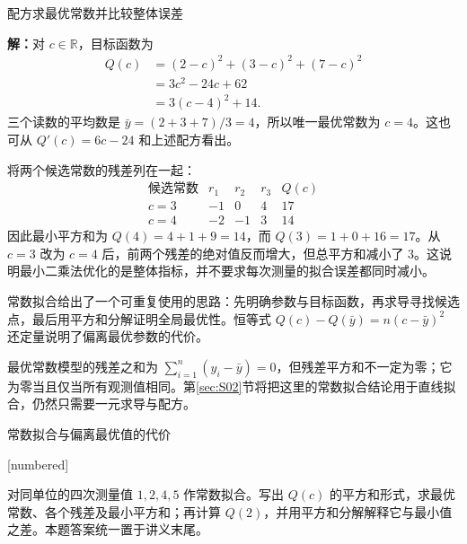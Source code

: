 \documentclass[aspectratio=169,10pt,fontset=fandol]{ctexbeamer}
\makeatletter
\newcommand{\mathagentexerciselabelcontext}[1]{%
\hypertarget<1>{#1}{}%
\edef\@currentHref{#1}%
}
\makeatother
\begin{document}
\begin{frame}[t,fragile]{配方求最优常数并比较整体误差}
\footnotesize
{\footnotesize
\par\noindent\textbf{解：}对 $c\in\mathbb{R}$，目标函数为
\[
\begin{aligned}
Q(c)&=(2-c)^2+(3-c)^2+(7-c)^2\\
&=3c^2-24c+62\\
&=3(c-4)^2+14.
\end{aligned}
\]
三个读数的平均数是 $\bar{y}=(2+3+7)/3=4$，所以唯一最优常数为 $c=4$。这也可从 $Q'(c)=6c-24$ 和上述配方看出。


}
{\footnotesize
将两个候选常数的残差列在一起：
\[
\begin{array}{c|rrr|r}
\text{候选常数}&r_1&r_2&r_3&Q(c)\\ \hline
c=3&-1&0&4&17\\
c=4&-2&-1&3&14
\end{array}
\]
因此最小平方和为 $Q(4)=4+1+9=14$，而 $Q(3)=1+0+16=17$。从 $c=3$ 改为 $c=4$ 后，前两个残差的绝对值反而增大，但总平方和减小了 $3$。这说明最小二乘法优化的是整体指标，并不要求每次测量的拟合误差都同时减小。\par

}
{\footnotesize
常数拟合给出了一个可重复使用的思路：先明确参数与目标函数，再求导寻找候选点，最后用平方和分解证明全局最优性。恒等式 $Q(c)-Q(\bar{y})=n(c-\bar{y})^2$ 还定量说明了偏离最优参数的代价。


}
{\footnotesize
最优常数模型的残差之和为 $\sum_{i=1}^{n}(y_i-\bar{y})=0$，但残差平方和不一定为零；它为零当且仅当所有观测值相同。第\ref{sec:S02}节将把这里的常数拟合结论用于直线拟合，仍然只需要一元求导与配方。\par

}
\end{frame}
\begin{frame}[t,fragile]{常数拟合与偏离最优值的代价}
\normalsize
{\normalsize
[numbered]
\mathagentexerciselabelcontext{mathagent.exercise.U0014.0}
\begin{exercise}
\label{mathagent:exercise:79e91357ee05b8b9aa4c657d553157f1ef411624d282c3f2337dd0e01453ce2d}
对同单位的四次测量值 $1,2,4,5$ 作常数拟合。写出 $Q(c)$ 的平方和形式，求最优常数、各个残差及最小平方和；再计算 $Q(2)$，并用平方和分解解释它与最小值之差。本题答案统一置于讲义末尾。
\end{exercise}
}
\end{frame}
\end{document}

